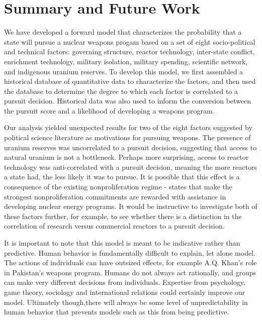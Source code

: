 \section{Summary and Future Work}
\label{s_future}

We have developed a forward model that characterizes the probability that a state will pursue a nuclear weapons progam based on a set of eight socio-political and technical factors: governing structure, reactor technology,  inter-state conflict,  enrichment technology, military isolation, military spending, scientific network, and indigenous uranium reserves. To develop this model, we first assembled a historical database of quantitative data to characterize the factors, and then used the database to determine the degree to which each factor is correlated to a pursuit decision. Historical data was also used to inform the conversion between the pursuit score and a likelihood of developing a weapons program. 

Our analysis yielded unexpected results for two of the eight factors suggested by political science literature as motivations for pursuing weapons. The presence of uranium reserves was uncorrelated to a pursuit decision, suggesting that access to natural uranium is not a bottleneck.  Perhaps more surprising, access to reactor technology was anti-correlated with a pursuit decision, meaning the more reactors a state had, the less likely it was to pursue. It is possible that this effect is a consequence of the existing nonproliferation regime - states that make the strongest nonproliferation commitments are rewarded with assistance in developing nuclear energy programs.  It would be instructive to investigate both of these factors further, for example, to see whether there is a distinction in the correlation of research versus commercial reactors to a pursuit decision.

It is important to note that this model is meant to be indicative rather than predictive. Human behavior is fundamentally difficult to explain, let alone model.  The actions of individuals can have outsized effects, for example A.Q. Khan's role in Pakistan's weapons program.  Humans do not always act rationally, and groups can make very different decisions from individuals.  Expertise from psychology, game theory, sociology and international relations could certainly improve our model. Ultimately though,there will always be some level of unpredictability in human behavior that prevents models such as this from being predictive.

